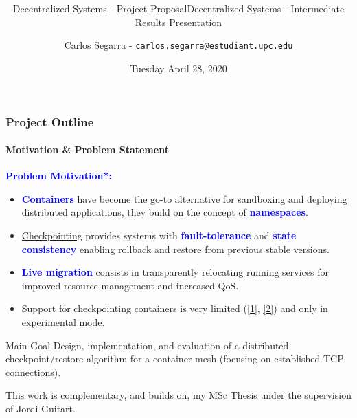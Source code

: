 \documentclass[9pt,    %
    english,            %
    xcolor=table,       %
    envcountsect,        %
    aspectratio=169     %
]{beamer}
\subtitle{Decentralized Systems - Project Proposal} %
\title[\mainTitle] %
    {\Large \mainTitle \\ \normalsize \secondTitle}
\subtitle{Decentralized Systems - Intermediate Results Presentation} %
\date[April 28, 2020] %
    {Tuesday April 28, 2020}
\author[] %
{Carlos Segarra - \texttt{carlos.segarra@estudiant.upc.edu}}
\begin{document}
\begin{frame}
  \titlepage
\end{frame}

\begin{frame}
    \frametitle{Project Outline}
    \framesubtitle{Motivation \& Problem Statement}


    \textbf{\textcolor{blue}{Problem Motivation*:}}
    \begin{itemize}
        \item \textbf{\textcolor{blue}{Containers}} have become the go-to alternative for sandboxing and deploying distributed applications, they build on the concept of \textbf{\textcolor{blue}{namespaces}}.
        \item \href{https://en.wikipedia.org/wiki/Application_checkpointing}{Checkpointing} provides systems with \textbf{\textcolor{blue}{fault-tolerance}} and \textbf{\textcolor{blue}{state consistency}} enabling rollback and restore from previous stable versions.
        \item \textbf{\textcolor{blue}{Live migration}} consists in transparently relocating running services for improved resource-management and increased QoS.
        \item Support for checkpointing containers is very limited (\href{https://github.com/docker/cli/blob/master/experimental/checkpoint-restore.md}{[1]}, \href{https://criu.org/Docker}{[2]}) and only in experimental mode. 
    \end{itemize}

    \begin{alertblock}{Main Goal}
        Design, implementation, and evaluation of a distributed checkpoint/restore algorithm for a container mesh (focusing on established TCP connections).
    \end{alertblock}

    \vspace{1pt}
    \small
    \begin{description}
        \item *This work is complementary, and builds on, my MSc Thesis under the supervision of Jordi Guitart.
    \end{description}
\end{frame}
\end{document}
